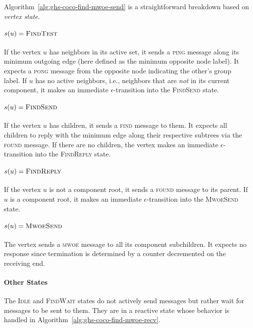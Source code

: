 \documentclass[11pt,epsf]{article}
\begin{document}
{{{\begin{algorithm}
\begin{algorithmic}
        \end{algorithmic}
      \end{algorithm}
      Algorithm~\ref{alg:ghs-coco-find-mwoe-send} is a straightforward breakdown based on \emph{vertex state}.
    }
    \paragraph{$s(u) = \textsc{FindTest}$}{
      If the vertex $u$ has neighbors in its active set, it sends a \textsc{ping} message along
      its minimum outgoing edge (here defined as the minimum opposite node label). It expects a
      \textsc{pong} message from the opposite node indicating the other's group label.
      If $u$ has no active neighbors, i.e., neighbors that are \emph{not} in its current component,
      it makes an immediate $\epsilon$-transition into the \textsc{FindSend} state.
    }
    \paragraph{$s(u) = \textsc{FindSend}$}{
      If the vertex $u$ has children, it sends a \textsc{find} message to them. It expects all children
      to reply with the minimum edge along their respective subtrees via the \textsc{found} message.
      If there are no children, the vertex makes an immediate $\epsilon$-transition into the
      \textsc{FindReply} state.
    }
    \paragraph{$s(u) = \textsc{FindReply}$}{
      If the vertex $u$ is not a component root, it sends a \textsc{found} message to its parent.
      If $u$ is a component root, it makes an immediate $\epsilon$-transition into the \textsc{MwoeSend}
      state.
    }
    \paragraph{$s(u) = \textsc{MwoeSend}$}{
      The vertex sends a \textsc{mwoe} message to all its component subchildren. It expects no response
      since termination is determined by a counter decremented on the receiving end.
    }
    \paragraph{Other States}{
      The \textsc{Idle} and \textsc{FindWait} states do not actively send messages but rather wait
      for messages to be sent to them. They are in a reactive state whose behavior is handled in
      Algorithm~\ref{alg:ghs-coco-find-mwoe-recv}.
    }
}}
\end{document}

